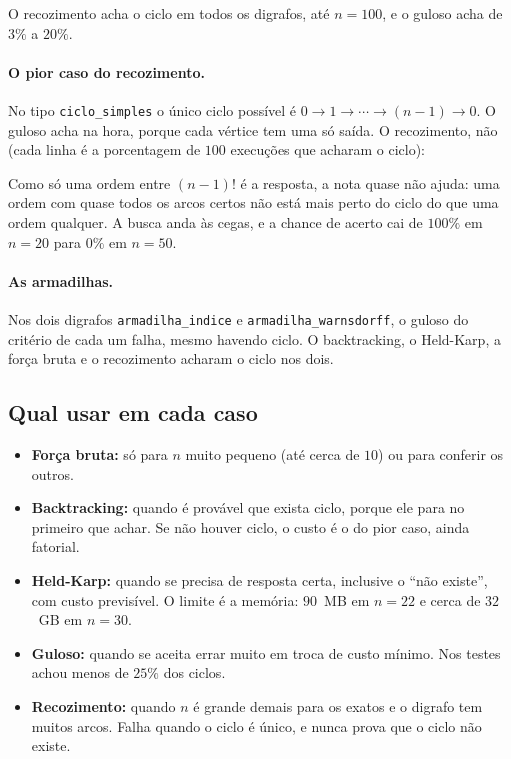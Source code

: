 \documentclass[12pt,a4paper]{article}
\begin{document}
\begin{center}
\small
\tabelagrandes
\end{center}

O recozimento acha o ciclo em todos os digrafos, até $n=100$, e o guloso acha de $3\%$ a $20\%$.

\paragraph{O pior caso do recozimento.} No tipo \texttt{ciclo\_simples} o único ciclo possível é $0\to1\to\cdots\to(n-1)\to0$. O guloso acha na hora, porque cada vértice tem uma só saída. O recozimento, não (cada linha é a porcentagem de $100$ execuções que acharam o ciclo):

\begin{center}
\small
\tabelaciclosimples
\end{center}

Como só uma ordem entre $(n-1)!$ é a resposta, a nota quase não ajuda: uma ordem com quase todos os arcos certos não está mais perto do ciclo do que uma ordem qualquer. A busca anda às cegas, e a chance de acerto cai de $100\%$ em $n=20$ para $0\%$ em $n=50$.

\paragraph{As armadilhas.} Nos dois digrafos \texttt{armadilha\_indice} e \texttt{armadilha\_warnsdorff}, o guloso do critério de cada um falha, mesmo havendo ciclo. O backtracking, o Held-Karp, a força bruta e o recozimento acharam o ciclo nos dois.

\subsection{Qual usar em cada caso}

\begin{itemize}
  \item \textbf{Força bruta:} só para $n$ muito pequeno (até cerca de $10$) ou para conferir os outros.
  \item \textbf{Backtracking:} quando é provável que exista ciclo, porque ele para no primeiro que achar. Se não houver ciclo, o custo é o do pior caso, ainda fatorial.
  \item \textbf{Held-Karp:} quando se precisa de resposta certa, inclusive o ``não existe'', com custo previsível. O limite é a memória: $90$~MB em $n=22$ e cerca de $32$~GB em $n=30$.
  \item \textbf{Guloso:} quando se aceita errar muito em troca de custo mínimo. Nos testes achou menos de $25\%$ dos ciclos.
  \item \textbf{Recozimento:} quando $n$ é grande demais para os exatos e o digrafo tem muitos arcos. Falha quando o ciclo é único, e nunca prova que o ciclo não existe.
\end{itemize}
\end{document}
